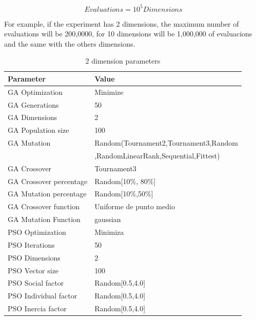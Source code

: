 \documentclass[runningheads]{llncs}
\begin{document}
\begin{equation}
    \label{eq:hesitancy-interpretation}
   Evaluations = 10^{5} Dimensions
   \end{equation}

For example, if the experiment has 2 dimensions, the maximum number of evaluations will be 200,0000, for 10 dimensions will be 1,000,000 of evaluacions and the same with the others dimensions.









   \begin{table}[htp]
    \caption{2 dimension parameters}
    \label{table:ga-pso-parameters-2}
    \centering
    \begin{tabular}{|l|l|}
    \hline
    Parameter & Value \\
    \hline
    \hline
    GA Optimization & Minimize \\
    \hline
    GA Generations & 50 \\
    \hline
    GA Dimensions & 2 \\
    \hline
    GA Population size & 100 \\
    \hline
    GA Mutation & Random(Tournament2,Tournament3,Random \\
    &  ,RandomLinearRank,Sequential,Fittest)\\
    \hline
    GA Crossover & Tournament3 \\
    \hline
    GA Crossover percentage & Random[10\%, 80\%] \\
    \hline
    GA Mutation percentage & Random[10\%,50\%] \\
    \hline
    GA Crossover function & Uniforme de punto medio \\
    \hline
    GA Mutation Function & gaussian \\
    \hline
    PSO Optimization & Minimiza \\
    \hline
    PSO Iterations & 50 \\
    \hline
    PSO Dimensions & 2 \\
    \hline
    PSO Vector size & 100 \\
    \hline
    PSO Social factor & Random[0.5,4.0] \\
    \hline
    PSO Individual factor & Random[0.5,4.0] \\
    \hline
    PSO Inercia factor & Random[0.5,4.0] \\
    \hline
    \end{tabular}
    \end{table}
\end{document}
